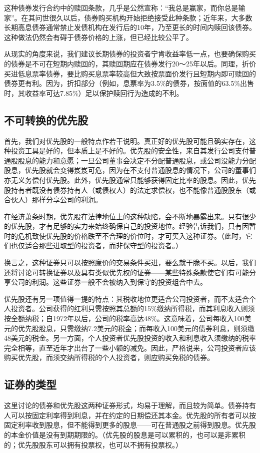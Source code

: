 \documentclass[12pt,oneside]{book}
\begin{document}
这种债券发行合约中的赎回条款，几乎是公然宣称：“我总是赢家，而你总是输家”。在其问世很久以后，债券购买机构开始拒绝接受此种条款；近年来，大多数长期高息债券通常禁止发债机构在发行后的10年，乃至更长的时间内赎回该债券。这种做法仍然会有碍于债券价格的上涨，但已经比较公平了。

从现实的角度来说，我们建议长期债券的投资者宁肯收益率低一点，也要确保购买的债券是不可在短期内赎回的，其赎回期应在债券发行20～25年以后。同理，折价买进低息票率债券，要比购买息票率较高但大致按票面价发行且短期内即可赎回的债券更有利。因为，折扣部分（例如，息票率为3.5\%的债券，按面值的63.5\%出售时，其收益率可达7.85\%）足以保护赎回行为造成的不利。

\subsection{不可转换的优先股}
首先，我们对优先股的一般特点作若干说明。真正好的优先股可能且确实存在，这种投资工具是好的，但本质上是不好的。优先股的安全性，来自其发行公司支付普通股股息的能力和意愿；一旦公司董事会决定不分配普通股息，或公司没能力分配股息，优先股就会变得岌岌可危，因为在不支付普通股息的情况下，公司的董事们亦无义务偿付优先股。此外，优先股通常只能够获得固定比率的股息。因此，优先股持有者既没有债券持有人（或债权人）的法定求偿权，也不能像普通股股东（或合伙人）那样分享公司的利润。

在经济萧条时期，优先股在法律地位上的这种缺陷，会不断地暴露出来。只有很少的优先股，才有足够的实力来始终确保自己的投资地位。经验告诉我们，只有因暂时的危机致使优先股的价格跌至不合理的价位时，才可买入这种证券。（此时，它们也仅适合那些进取型的投资者，而非保守型的投资者。）

换言之，这种证券只可以按照廉价的交易条件买进，要么就干脆不买。以后，我们还将讨论可转换证券以及具有类似优先权的证券——某些特殊条款使它们有可能分享公司的利润。这些证券一般不会被纳入到保守的投资组合中去。

优先股还有另一项值得一提的特点：其税收地位更适合公司投资者，而不太适合个人投资者。公司获得的红利只需按照其总额的15\%缴纳所得税，而其利息收入则须按全额纳税；自1972年以后，公司的税率高达48\%。这意味着，公司每收入100美元的优先股股息，只需缴纳7.2美元的税金；而每收入100美元的债券利息，则须缴48美元的税金。另一方面，个人投资者优先股投资的收入和利息收入须缴纳的税率完全相等，直至近年才出台了一些小额的减免。因此，严格说来，公司投资者应该购买优先股，而须交纳所得税的个人投资者，则应购买免税的债券。

\subsection{证券的类型}
这里讨论的债券和优先股这两种证券形式，均易于理解，而且较为简单。债券持有人可以按固定利率得到利息，并在约定的日期偿还其本金。优先股的所有者可以按固定利率收到股息，但不能得到更多的股息——可在普通股之前得到股息。优先股的本金价值是没有到期期限的。（优先股的股息是可以累积的，也可以是非累积的；优先股股东可以拥有投票权，也可以不拥有投票权。）
\end{document}
